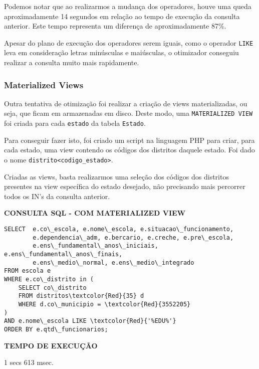 \documentclass[12pt,a4paper]{article}
\begin{document}
Podemos notar que ao realizarmos a mudança dos operadores, houve uma queda aproximadamente 14 segundos em relação ao tempo de execução da consulta anterior. Este tempo representa um diferença de aproximadamente 87\%.   

Apesar do plano de execução dos operadores serem iguais, como o operador \texttt{LIKE} leva em consideração letras minúsculas e maiúsculas, o otimizador conseguiu realizar a consulta muito mais rapidamente.


\subsubsection{Materialized Views}

Outra tentativa de otimização foi realizar a criação de views materializadas, ou seja, que ficam em armazenadas em disco. Deste modo, uma \texttt{MATERIALIZED VIEW} foi criada para cada \texttt{estado} da tabela \texttt{Estado}. 

Para conseguir fazer isto, foi criado um script na linguagem PHP para criar, para cada estado, uma view contendo os códigos dos distritos daquele estado. Foi dado o nome \texttt{distrito<codigo\_estado>}.

Criadas as views, basta realizarmos uma seleção dos códigos dos distritos presentes na view específica do estado desejado, não precisando mais percorrer todos os IN's da consulta anterior.

\vspace{0.5cm}
\begin{flushleft}
\textbf{CONSULTA SQL - COM MATERIALIZED VIEW}\\
\end{flushleft}

\begin{Verbatim}[commandchars=\\\{\}]
SELECT  e.co\_escola, e.nome\_escola, e.situacao\_funcionamento, 
        e.dependencia\_adm, e.bercario, e.creche, e.pre\_escola,
        e.ens\_fundamental\_anos\_iniciais, e.ens\_fundamental\_anos\_finais,
        e.ens\_medio\_normal, e.ens\_medio\_integrado
FROM escola e
WHERE e.co\_distrito in (
    SELECT co\_distrito
    FROM distritos\textcolor{Red}{35} d
    WHERE d.co\_municipio = \textcolor{Red}{3552205}
)
AND e.nome\_escola LIKE \textcolor{Red}{'%EDU%'}
ORDER BY e.qtd\_funcionarios;
\end{Verbatim}

\vspace{0.01cm}
\begin{flushleft}
\textbf{TEMPO DE EXECUÇÃO}\\
\end{flushleft}
1 secs 613 msec.\\
\end{document}
